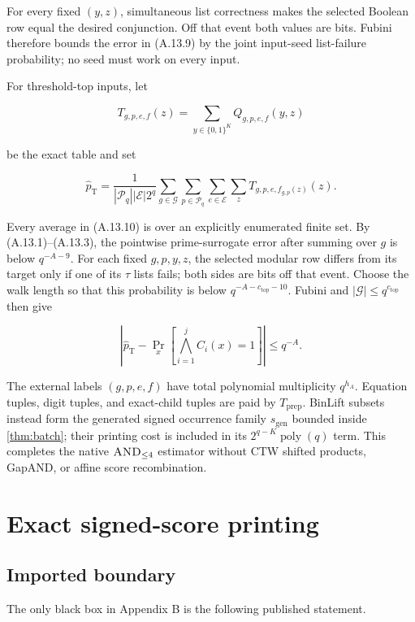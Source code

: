 \documentclass[11pt,letterpaper]{article}
\newcommand{\cref}[1]{\ref{#1}}
\theoremstyle{definition}
\theoremstyle{remark}
\newcommand{\ANDfour}{\textsc{AND}_{\le 4}}
\newcommand{\poly}{\operatorname{poly}}
\begin{document}
For every fixed \((y,z)\), simultaneous list correctness makes the
selected Boolean row equal the desired conjunction. Off that event both
values are bits. Fubini therefore bounds the error in (A.13.9) by the
joint input-seed list-failure probability; no seed must work on every
input.

For threshold-top inputs, let

\[
T_{g,p,e,f}(z)
{}={}
\sum_{y\in\{0,1\}^K}
Q_{g,p,e,f}(y,z)
\]

be the exact table and set

\[
\widehat p_{\mathrm T}
{}={}
\frac1{|\mathcal P_q||\mathcal E|2^q}
\sum_{g\in\mathcal G}
\sum_{p\in\mathcal P_q}
\sum_{e\in\mathcal E}
\sum_z
T_{g,p,e,f_{g,p}(z)}(z).
\tag{A.13.10}
\]

Every average in (A.13.10) is over an explicitly enumerated finite set.
By (A.13.1)--(A.13.3), the pointwise prime-surrogate error after
summing over \(g\) is below \(q^{-A-9}\). For each fixed \(g,p,y,z\),
the selected modular row differs from its target only if one of its
\(\tau\) lists fails; both sides are bits off that event. Choose the
walk length so that this probability is below
\(q^{-A-c_{\mathrm{top}}-10}\). Fubini and
\(|\mathcal G|\le q^{c_{\mathrm{top}}}\) then give

\[
\left|
\widehat p_{\mathrm T}
{}-{}
\Pr_x\left[\bigwedge_{i=1}^jC_i(x)=1\right]
\right|
\le
q^{-A}.
\]

The external labels \((g,p,e,f)\) have total polynomial multiplicity
\(q^{h_A}\). Equation tuples, digit tuples, and exact-child tuples are paid
by \(T_{\mathrm{prep}}\). BinLift subsets instead form the generated signed
occurrence family \(s_{\mathrm{gen}}\) bounded inside \cref{thm:batch}; their
printing cost is included in its \(2^{q-K}\poly(q)\) term. This completes
the native \(\ANDfour\) estimator
without CTW shifted products, GapAND, or affine score recombination.

\section{Exact signed-score
printing}\label{appendix-b-exact-signed-score-printing}

\subsection{Imported boundary}\label{b1-imported-boundary}

The only black box in Appendix B is the following published statement.
\end{document}
